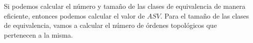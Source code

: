 \begin{comment}
\santi{Acá creo que solo hay que poner $\toOr^1_{<i} = \toOr^2_{<i}$, que denota que el conjunto de variables que quedan fijas es el mismo. Pedir esto con el $\charactheristicFunction$ es más laxo pero no sabemos controlarlo.}
\echu{Pero la idea es justamente que no importe el orden de los elementos tampoco, o sea sólo ver que los conjuntos son iguales}
\santi{Pero vos no estás pidiendo que los conjuntos sean iguales, sino que pedís que la función evaluada en esos conjuntos lo sea. O sea, hay conjuntos que no son iguales pero a lo mejor si los evaluás te da igual. Ahora mismo escribiste esta última relación.}
\santi{Quedamos en definir la relación ``ideal'' $R^*$ que captura que dos permutaciones son iguales si dan la misma evaluación. Como eso es difícil, solamente calculamos la relación $R$ que dice que dos permutaciones son iguales si tienen el mismo conjunto de nodos antes del nodo $x_i$.}    
\end{comment}



Si podemos calcular el número y tamaño de las clases de equivalencia de manera eficiente, entonces podemos calcular el valor de $ASV$. Para el tamaño de las clases de equivalencia, vamos a calcular el número de órdenes topológicos que pertenecen a la misma. 

